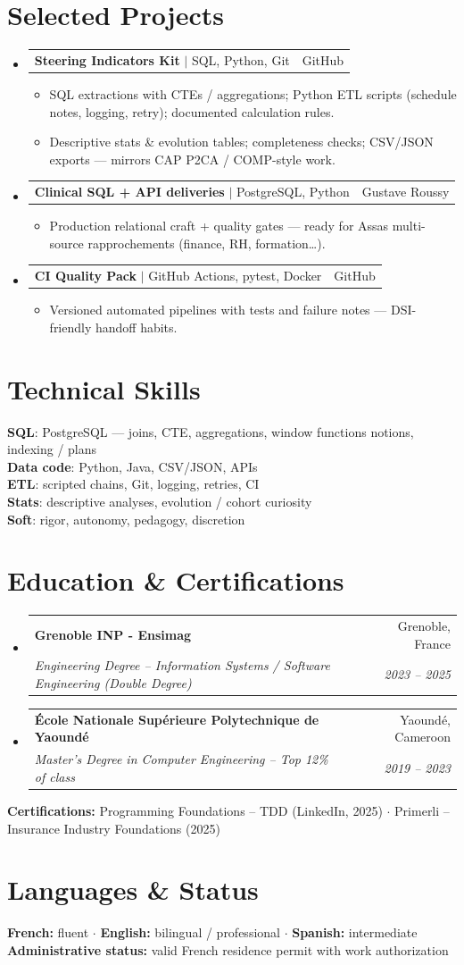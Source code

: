\documentclass[letterpaper,10.5pt]{article}
\makeatletter
\newcommand{\resumeItem}[1]{\item\small{#1 \vspace{-1.5pt}}}
\newcommand{\resumeSubheading}[4]{\vspace{-1pt}\item\begin{tabular*}{0.97\textwidth}[t]{l@{\extracolsep{\fill}}r}\textbf{#1} & #2 \\\textit{\small#3} & \textit{\small #4} \\\end{tabular*}\vspace{-5pt}}
\newcommand{\resumeProjectHeading}[2]{\item\begin{tabular*}{0.97\textwidth}{l@{\extracolsep{\fill}}r}\small#1 & #2 \\\end{tabular*}\vspace{-5pt}}
\newcommand{\resumeSubHeadingListStart}{\begin{itemize}[leftmargin=0.15in, label={}]}
\newcommand{\resumeSubHeadingListEnd}{\end{itemize}}
\newcommand{\resumeItemListStart}{\begin{itemize}[leftmargin=0.18in]}
\newcommand{\resumeItemListEnd}{\end{itemize}\vspace{-3pt}}
\makeatother
\begin{document}
\section{Selected Projects}
\resumeSubHeadingListStart
  \resumeProjectHeading{\textbf{Steering Indicators Kit} $|$ SQL, Python, Git}{GitHub}
    \resumeItemListStart
      \resumeItem{SQL extractions with CTEs / aggregations; Python ETL scripts (schedule notes, logging, retry); documented calculation rules.}
      \resumeItem{Descriptive stats \& evolution tables; completeness checks; CSV/JSON exports --- mirrors CAP P2CA / COMP-style work.}
    \resumeItemListEnd
  \resumeProjectHeading{\textbf{Clinical SQL + API deliveries} $|$ PostgreSQL, Python}{Gustave Roussy}
    \resumeItemListStart
      \resumeItem{Production relational craft + quality gates --- ready for Assas multi-source rapprochements (finance, RH, formation\ldots).}
    \resumeItemListEnd
  \resumeProjectHeading{\textbf{CI Quality Pack} $|$ GitHub Actions, pytest, Docker}{GitHub}
    \resumeItemListStart
      \resumeItem{Versioned automated pipelines with tests and failure notes --- DSI-friendly handoff habits.}
    \resumeItemListEnd
\resumeSubHeadingListEnd
\section{Technical Skills}
\begin{itemize}[leftmargin=0.15in, label={}]\small{\item{
\textbf{SQL}: PostgreSQL --- joins, CTE, aggregations, window functions notions, indexing / plans \\
\textbf{Data code}: Python, Java, CSV/JSON, APIs \\
\textbf{ETL}: scripted chains, Git, logging, retries, CI \\
\textbf{Stats}: descriptive analyses, evolution / cohort curiosity \\
\textbf{Soft}: rigor, autonomy, pedagogy, discretion
}}\end{itemize}
\section{Education \& Certifications}
\resumeSubHeadingListStart
  \resumeSubheading{Grenoble INP - Ensimag}{Grenoble, France}{Engineering Degree -- Information Systems / Software Engineering (Double Degree)}{2023 -- 2025}
  \resumeSubheading{\'Ecole Nationale Sup\'erieure Polytechnique de Yaound\'e}{Yaound\'e, Cameroon}{Master's Degree in Computer Engineering -- Top 12\% of class}{2019 -- 2023}
\resumeSubHeadingListEnd
\small{\textbf{Certifications:} Programming Foundations -- TDD (LinkedIn, 2025) $\cdot$ Primerli -- Insurance Industry Foundations (2025)}
\section{Languages \& Status}
\small{\textbf{French:} fluent $\cdot$ \textbf{English:} bilingual / professional $\cdot$ \textbf{Spanish:} intermediate \\ \textbf{Administrative status:} valid French residence permit with work authorization}
\end{document}
